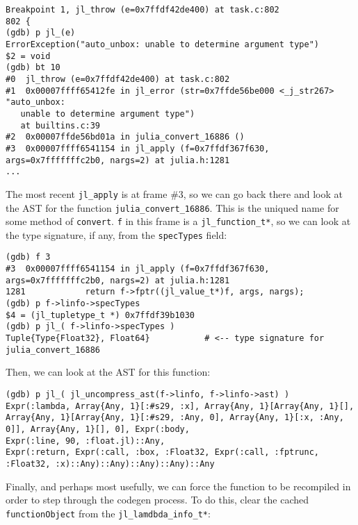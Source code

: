 \begin{lstlisting}
Breakpoint 1, jl_throw (e=0x7ffdf42de400) at task.c:802
802 {
(gdb) p jl_(e)
ErrorException("auto_unbox: unable to determine argument type")
$2 = void
(gdb) bt 10
#0  jl_throw (e=0x7ffdf42de400) at task.c:802
#1  0x00007ffff65412fe in jl_error (str=0x7ffde56be000 <_j_str267> "auto_unbox:
   unable to determine argument type")
   at builtins.c:39
#2  0x00007ffde56bd01a in julia_convert_16886 ()
#3  0x00007ffff6541154 in jl_apply (f=0x7ffdf367f630, args=0x7fffffffc2b0, nargs=2) at julia.h:1281
...
\end{lstlisting}



The most recent \texttt{jl\_apply} is at frame \#3, so we can go back there and look at the AST for the function \texttt{julia\_convert\_16886}. This is the uniqued name for some method of \texttt{convert}. \texttt{f} in this frame is a \texttt{jl\_function\_t*}, so we can look at the type signature, if any, from the \texttt{specTypes} field:




\begin{lstlisting}
(gdb) f 3
#3  0x00007ffff6541154 in jl_apply (f=0x7ffdf367f630, args=0x7fffffffc2b0, nargs=2) at julia.h:1281
1281            return f->fptr((jl_value_t*)f, args, nargs);
(gdb) p f->linfo->specTypes
$4 = (jl_tupletype_t *) 0x7ffdf39b1030
(gdb) p jl_( f->linfo->specTypes )
Tuple{Type{Float32}, Float64}           # <-- type signature for julia_convert_16886
\end{lstlisting}



Then, we can look at the AST for this function:




\begin{lstlisting}
(gdb) p jl_( jl_uncompress_ast(f->linfo, f->linfo->ast) )
Expr(:lambda, Array{Any, 1}[:#s29, :x], Array{Any, 1}[Array{Any, 1}[], Array{Any, 1}[Array{Any, 1}[:#s29, :Any, 0], Array{Any, 1}[:x, :Any, 0]], Array{Any, 1}[], 0], Expr(:body,
Expr(:line, 90, :float.jl)::Any,
Expr(:return, Expr(:call, :box, :Float32, Expr(:call, :fptrunc, :Float32, :x)::Any)::Any)::Any)::Any)::Any
\end{lstlisting}



Finally, and perhaps most usefully, we can force the function to be recompiled in order to step through the codegen process. To do this, clear the cached \texttt{functionObject} from the \texttt{jl\_lamdbda\_info\_t*}:




